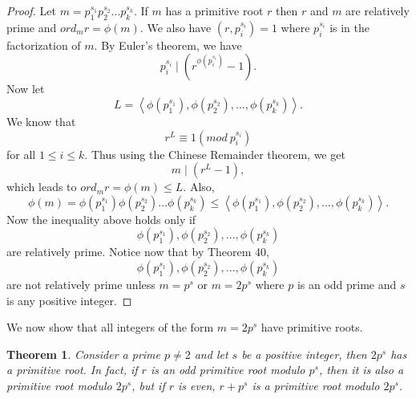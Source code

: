 \documentclass[12pt,letterpaper]{book}
\newtheorem{theorem}{Theorem}
\begin{document}
\begin{proof}
Let $m=p_1^{s_1}p_2^{s_2}...p_k^{s_k}$. If $m$ has a primitive root
$r$ then $r$ and $m$ are relatively prime and $ord_mr=\phi(m)$. We
also have $(r,p_i^{s_i})=1$ where $p_i^{s_i}$ is in the
factorization of $m$.  By Euler's theorem, we have
\begin{equation*}
p_i^{s_i}\mid (r^{\phi(p_i^{s_i})}-1).
\end{equation*}
Now let
\begin{equation*}
L=\left\langle \phi(p_1^{s_1}), \phi(p_2^{s_2}),...,\phi(p_k^{s_k})\right\rangle.
\end{equation*}
We know that
\begin{equation*}
r^L\equiv 1(mod \ p_i^{s_i})
\end{equation*}
for all $1\leq i\leq k$.  Thus using the Chinese Remainder theorem,
we get
\begin{equation*}
m\mid (r^L-1),
\end{equation*}
which leads to $ord_mr=\phi(m)\leq L$. Also, 
\begin{equation*}
\phi(m)=\phi(p_1^{s_1})\phi(p_2^{s_2})...\phi(p_k^{s_k})\leq
\left\langle \phi(p_1^{s_1}),\phi(p_2^{s_2}),...,\phi(p_k^{s_k})\right\rangle.
\end{equation*}
Now the inequality above holds only if
\begin{equation*}
\phi(p_1^{s_1}),\phi(p_2^{s_2}),...,\phi(p_k^{s_k})
\end{equation*}
are relatively prime.  Notice now that by Theorem 40,
\begin{equation*}
\phi(p_1^{s_1}),\phi(p_2^{s_2}),...,\phi(p_k^{s_k})
\end{equation*}
are not relatively prime unless $m=p^s$ or $m=2p^s$ where $p$ is an
odd prime and $s$ is any positive integer.
\end{proof}

We now show that all integers of the form $m=2p^s$ have primitive
roots.

\begin{theorem}\label{Primitive3}
Consider a prime $p\neq 2$ and let $s$ be a positive integer, then
$2p^s$ has a primitive root.  In fact, if $r$ is an odd primitive
root modulo $p^s$, then it is also a primitive root modulo $2p^s$,
but if $r$ is even, $r+p^s$ is a primitive root modulo $2p^s$.
\end{theorem}
\end{document}
